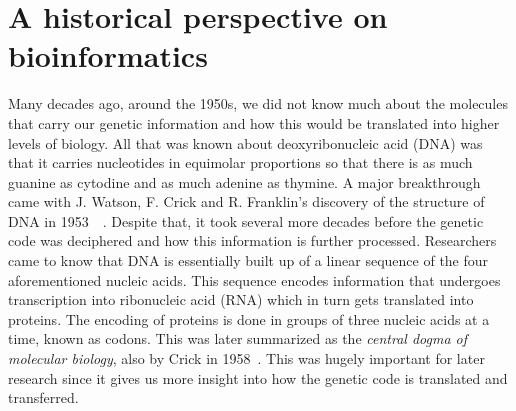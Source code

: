 \section{A historical perspective on bioinformatics}
Many decades ago, around the 1950s, we did not know much about the molecules that carry our genetic information and how this would be translated into higher levels of biology. All that was known about deoxyribonucleic acid (DNA) was that it carries nucleotides in equimolar proportions so that there is as much guanine as cytodine and as much adenine as thymine. A major breakthrough came with J. Watson, F. Crick and R. Franklin's discovery of the structure of DNA in 1953~\cite{dnastruct}~\cite{franklin}. Despite that, it took several more decades before the genetic code was deciphered and how this information is further processed. Researchers came to know that DNA is essentially built up of a linear sequence of the four aforementioned nucleic acids. This sequence encodes information that undergoes transcription into ribonucleic acid (RNA) which in turn gets translated into proteins. The encoding of proteins is done in groups of three nucleic acids at a time, known as codons. This was later summarized as the \textit{central dogma of molecular biology}, also by Crick in 1958~\cite{dogma}. This was hugely important for later research since it gives us more insight into how the genetic code is translated and transferred.

